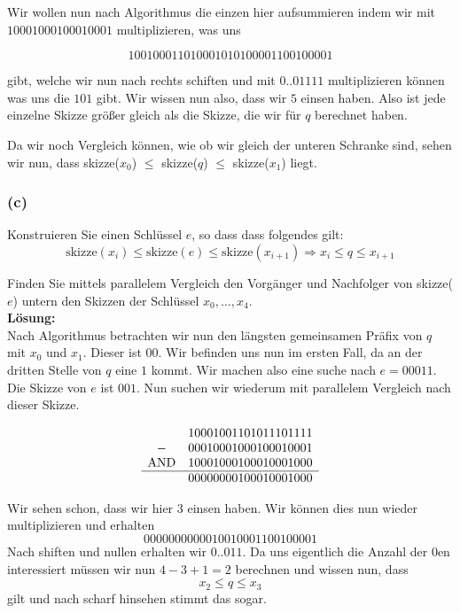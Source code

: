 \documentclass[11pt,a4paper,ngerman]{article}
\begin{document}
Wir wollen nun nach Algorithmus die einzen hier aufsummieren indem wir mit
$10001000100010001$ multiplizieren, was uns

$$1 0010 0011 0100 0101 0100 0011 0010 0001$$

gibt, welche wir nun nach rechts schiften und mit $0..01111$ multiplizieren können
was uns die $101$ gibt. Wir wissen nun also, dass wir $5$ einsen haben. Also
ist jede einzelne Skizze größer gleich als die Skizze, die wir für $q$ berechnet haben.


Da wir noch Vergleich können, wie ob wir gleich der unteren Schranke sind, sehen wir
nun, dass skizze($x_0$) $\leq$ skizze($q$) $\leq$ skizze($x_1$) liegt.

\subsubsection*{(c)}

Konstruieren Sie einen Schlüssel $e$, so dass dass folgendes gilt:
$$
   \text{skizze}(x_i) \leq \text{skizze}(e) \leq \text{skizze}(x_{i+1}) 
      \Rightarrow x_i \leq q \leq x_{i+1}
$$

Finden Sie mittels parallelem Vergleich den Vorgänger und Nachfolger von skizze($e$) untern den Skizzen der Schlüssel $x_0, \ldots, x_4$.\\

\noindent\textbf{Lösung:}\\

Nach Algorithmus betrachten wir nun den längsten gemeinsamen Präfix von $q$ mit $x_0$ und $x_1$. Dieser ist $00$. Wir befinden uns nun im ersten Fall, da an der dritten Stelle von $q$ eine $1$ kommt. Wir machen also eine suche nach $e = 00011$.\\

Die Skizze von $e$ ist $001$. Nun suchen wir wiederum mit parallelem Vergleich nach
dieser Skizze.

$$
\begin{array}{cl}
     & 1 000 1 001 1 010 1 110 1 111\\
   - & 0 001 0 001 0 001 0 001 0 001\\
   \text{AND} & 1 000 1 000 1 000 1 000 1 000\\
   \hline
   & 0 000 0 000 1 000 1 000 1 000
\end{array}
$$

Wir sehen schon, dass wir hier $3$ einsen haben. Wir können dies nun wieder multiplizieren und erhalten
$$
 0000 0000 0001 0010 0011 0010 0001
$$
Nach shiften und nullen erhalten wir $0..011$. Da uns eigentlich die Anzahl der
$0$en interessiert müssen wir nun $4-3+1 = 2$ berechnen und wissen nun, dass
$$
   x_2 \leq q \leq x_3
$$
gilt und nach scharf hinsehen stimmt das sogar.
\label{LastPage}
\end{document}
